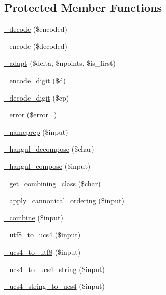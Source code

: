 \subsection*{Protected Member Functions}
\begin{DoxyCompactItemize}
\item 
\hyperlink{classidna__convert_a6e4c2f051cfd4ebd84d47c013c18205e}{\+\_\+decode} (\$encoded)
\item 
\hyperlink{classidna__convert_aa32f14e1635b5bcf8a1000721a53db8d}{\+\_\+encode} (\$decoded)
\item 
\hyperlink{classidna__convert_a521d4543ec6839af3283be4380e91a86}{\+\_\+adapt} (\$delta, \$npoints, \$is\+\_\+first)
\item 
\hyperlink{classidna__convert_afdb30c72ac13c3c71922afb63fabb37c}{\+\_\+encode\+\_\+digit} (\$d)
\item 
\hyperlink{classidna__convert_adb87b0a6d3168899e718dff394723e96}{\+\_\+decode\+\_\+digit} (\$cp)
\item 
\hyperlink{classidna__convert_a1a9abb3bcbd4425a4b1c013f50ab757b}{\+\_\+error} (\$error=\textquotesingle{}\textquotesingle{})
\item 
\hyperlink{classidna__convert_ac73124acc2f1e772fadd64d176bfe0b9}{\+\_\+nameprep} (\$input)
\item 
\hyperlink{classidna__convert_a9cc5a89053729bb98d2a0ecf143b2b2c}{\+\_\+hangul\+\_\+decompose} (\$char)
\item 
\hyperlink{classidna__convert_a33124ab535f6739a2a5e6fa46c532d28}{\+\_\+hangul\+\_\+compose} (\$input)
\item 
\hyperlink{classidna__convert_abd868ffb75c0d7633998ab14f6621dd3}{\+\_\+get\+\_\+combining\+\_\+class} (\$char)
\item 
\hyperlink{classidna__convert_a3e0f3eceeb2987f2b69b9a3cf6f7181a}{\+\_\+apply\+\_\+cannonical\+\_\+ordering} (\$input)
\item 
\hyperlink{classidna__convert_a751b0b8bfacdc3b79eb77018a508363d}{\+\_\+combine} (\$input)
\item 
\hyperlink{classidna__convert_abafc3eb23a9da5e7b53c5f9f8b7ee035}{\+\_\+utf8\+\_\+to\+\_\+ucs4} (\$input)
\item 
\hyperlink{classidna__convert_a3827709d9c0e35a164838064f73daea5}{\+\_\+ucs4\+\_\+to\+\_\+utf8} (\$input)
\item 
\hyperlink{classidna__convert_ac353a6fccbc4e8e15e90772acb6e2a74}{\+\_\+ucs4\+\_\+to\+\_\+ucs4\+\_\+string} (\$input)
\item 
\hyperlink{classidna__convert_ac95599caba5f1a276ba1a75a12d385dd}{\+\_\+ucs4\+\_\+string\+\_\+to\+\_\+ucs4} (\$input)
\end{DoxyCompactItemize}
